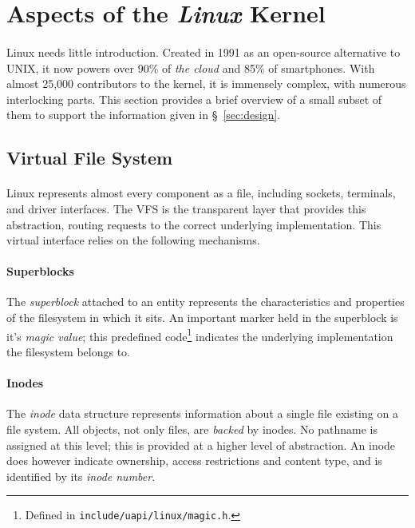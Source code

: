 
\section{Aspects of the \textit{Linux} Kernel}

\paragraph{} Linux needs little introduction. Created in 1991 as an open-source alternative to UNIX, it now powers over 90\% of \textit{the cloud} and 85\% of smartphones. With almost 25,000 contributors to the kernel, it is immensely complex, with numerous interlocking parts. This section provides a brief overview of a small subset of them to support the information given in §~\ref{sec:design}.

\subsection{Virtual File System}

\paragraph{} Linux represents almost every component as a file, including sockets, terminals, and driver interfaces. The VFS is the transparent layer that provides this abstraction, routing requests to the correct underlying implementation. This virtual interface relies on the following mechanisms.

\paragraph{Superblocks} The \textit{superblock} attached to an entity represents the characteristics and properties of the filesystem in which it sits. An important marker held in the superblock is it's \textit{magic value}; this predefined code\footnote{Defined in \texttt{include/uapi/linux/magic.h}.} indicates the underlying implementation the filesystem belongs to.

\paragraph{Inodes} The \textit{inode} data structure represents information about a single file existing on a file system. All objects, not only files, are \textit{backed} by inodes. No pathname is assigned at this level; this is provided at a higher level of abstraction. An inode does however indicate ownership, access restrictions and content type, and is identified by its \textit{inode number}.

